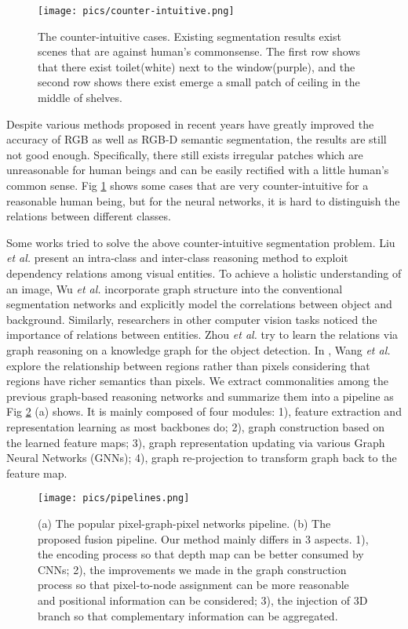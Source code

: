 ﻿\documentclass[journal]{IEEEtran}
\begin{document}
\begin{figure}
    \centering
    \texttt{[image: pics/counter-intuitive.png]}
    \caption{The counter-intuitive cases. Existing segmentation results exist scenes that are against human's commonsense. The first row shows that there exist toilet(white) next to the window(purple), and the second row shows there exist emerge a small patch of ceiling in the middle of shelves. }
    \label{fig_counter_intuitive}
\end{figure}

 
    Despite various methods proposed in recent years have greatly improved the accuracy of RGB as well as RGB-D semantic segmentation, the results are still not good enough. Specifically, there still exists irregular patches which are unreasonable for human beings and can be easily rectified with a little human's common sense. Fig \ref{fig_counter_intuitive} shows some cases that are very counter-intuitive for a reasonable human being, but for the neural networks, it is hard to distinguish the relations between different classes.

 
    Some works tried to solve the above counter-intuitive segmentation problem. Liu \emph{et al.} \cite{liu2021exploit} present an intra-class and inter-class reasoning method to exploit dependency relations among visual entities. To achieve a holistic understanding of an image, Wu \emph{et al.} \cite{wu2020bidirectional} incorporate graph structure into the conventional segmentation networks and explicitly model the correlations between object and background. Similarly, researchers in other computer vision tasks noticed the importance of relations between entities. Zhou \emph{et al.} \cite{zhou2021relation} try to learn the relations via graph reasoning on a knowledge graph for the object detection. In \cite{wang2020region}, Wang \emph{et al.} explore the relationship between regions rather than pixels considering that regions have richer semantics than pixels. We extract commonalities among the previous graph-based reasoning networks and summarize them into a pipeline as Fig \ref{fig_pipeline} (a) shows. It is mainly composed of four modules: 1), feature extraction and representation learning as most backbones do; 2), graph construction based on the learned feature maps; 3), graph representation updating via various Graph Neural Networks (GNNs); 4), graph re-projection to transform graph back to the feature map. 
    
\begin{figure}
    \centering
    \texttt{[image: pics/pipelines.png]}
    \caption{(a) The popular pixel-graph-pixel networks pipeline. (b) The proposed fusion pipeline. Our method mainly differs in 3 aspects. 1), the encoding process so that depth map can be better consumed by CNNs; 2), the improvements we made in the graph construction process so that pixel-to-node assignment can be more reasonable and positional information can be considered; 3), the injection of 3D branch so that complementary information can be aggregated.}
    \label{fig_pipeline}
\end{figure}
 
\end{document}
